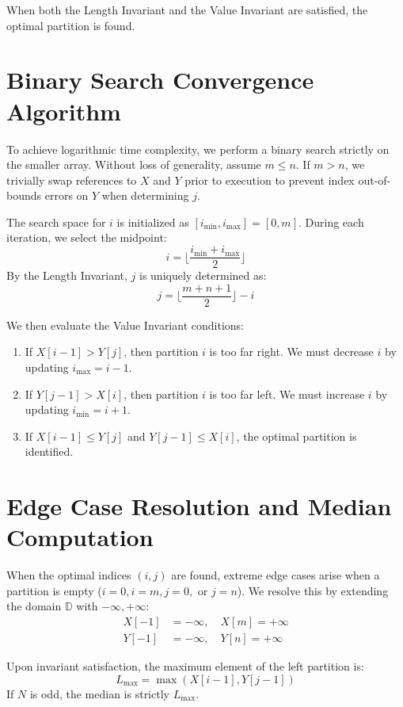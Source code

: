 \documentclass[10pt,journal,compsoc]{IEEEtran}
\begin{document}
When both the Length Invariant and the Value Invariant are satisfied, the optimal partition is found.

\section{Binary Search Convergence Algorithm}
To achieve logarithmic time complexity, we perform a binary search strictly on the smaller array. Without loss of generality, assume $m \le n$. If $m > n$, we trivially swap references to $X$ and $Y$ prior to execution to prevent index out-of-bounds errors on $Y$ when determining $j$.

The search space for $i$ is initialized as $[i_{\min}, i_{\max}] = [0, m]$.
During each iteration, we select the midpoint:
\begin{equation}
i = \lfloor \frac{i_{\min} + i_{\max}}{2} \rfloor
\end{equation}
By the Length Invariant, $j$ is uniquely determined as:
\begin{equation}
j = \lfloor \frac{m + n + 1}{2} \rfloor - i
\end{equation}

We then evaluate the Value Invariant conditions:
\begin{enumerate}
    \item If $X[i-1] > Y[j]$, then partition $i$ is too far right. We must decrease $i$ by updating $i_{\max} = i - 1$.
    \item If $Y[j-1] > X[i]$, then partition $i$ is too far left. We must increase $i$ by updating $i_{\min} = i + 1$.
    \item If $X[i-1] \le Y[j]$ and $Y[j-1] \le X[i]$, the optimal partition is identified.
\end{enumerate}

\section{Edge Case Resolution and Median Computation}
When the optimal indices $(i, j)$ are found, extreme edge cases arise when a partition is empty ($i=0, i=m, j=0,$ or $j=n$). We resolve this by extending the domain $\mathbb{D}$ with ${-\infty, +\infty}$:
\begin{align}
X[-1] &= -\infty, \quad X[m] = +\infty \\
Y[-1] &= -\infty, \quad Y[n] = +\infty
\end{align}

Upon invariant satisfaction, the maximum element of the left partition is:
\begin{equation}
L_{\max} = \max(X[i-1], Y[j-1])
\end{equation}
If $N$ is odd, the median is strictly $L_{\max}$.
\end{document}
